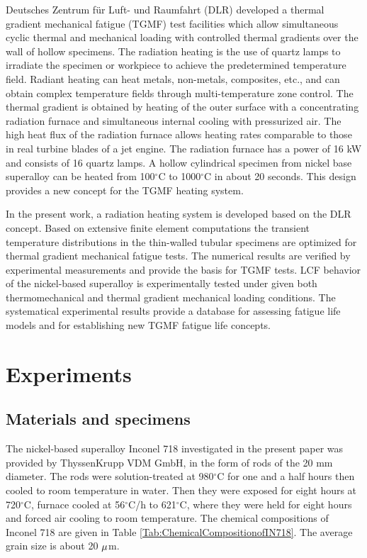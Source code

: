 \documentclass[preprint,5p,twocolumn,10pt,sort&compress]{elsarticle}
\begin{document}
Deutsches Zentrum f\"{u}r Luft- und Raumfahrt (DLR) \cite{BAUFELD2008219} developed a thermal gradient mechanical fatigue (TGMF) test facilities which allow simultaneous cyclic thermal and mechanical loading with controlled thermal gradients over the wall of hollow specimens. 
The radiation heating is the use of quartz lamps to irradiate the specimen or workpiece to achieve the predetermined temperature field. Radiant heating can heat metals, non-metals, composites, etc., and can obtain complex temperature fields through multi-temperature zone control.
The thermal gradient is obtained by heating of the outer surface with a concentrating radiation furnace and simultaneous internal cooling with pressurized air. The high heat flux of the radiation furnace allows heating rates comparable to those in real turbine blades of a jet engine. The radiation furnace has a power of 16 kW and consists of 16 quartz lamps. A hollow cylindrical specimen from nickel base superalloy can be heated from 100$^\circ$C to 1000$^\circ$C in about 20 seconds. This design provides a new concept for the TGMF heating system.

In the present work, a radiation heating system is developed based on the DLR concept. Based on extensive finite element computations the transient temperature distributions in the thin-walled tubular specimens are optimized for thermal gradient mechanical fatigue tests. The numerical results are verified by experimental measurements and provide the basis for TGMF tests. LCF behavior of the nickel-based superalloy is experimentally tested under given both thermomechanical and thermal gradient mechanical loading conditions. The systematical experimental results provide a database for assessing fatigue life models and for establishing new TGMF fatigue life concepts. 

\section{Experiments}

\subsection{Materials and specimens}
The nickel-based superalloy Inconel 718 investigated in the present paper was provided by ThyssenKrupp VDM GmbH, in the form of rods of the 20 mm diameter.
The rods were solution-treated at 980$^{\circ}$C for one and a half hours then cooled to room temperature in water.
Then they were exposed for eight hours at 720$^{\circ}$C, furnace cooled at 56$^{\circ}$C/h to 621$^{\circ}$C, where they were held for eight hours and forced air cooling to room temperature.
The chemical compositions of Inconel 718 are given in Table \ref{Tab:ChemicalCompositionofIN718}.
The average grain size is about 20 $\rm{\mu }$m.
\end{document}
